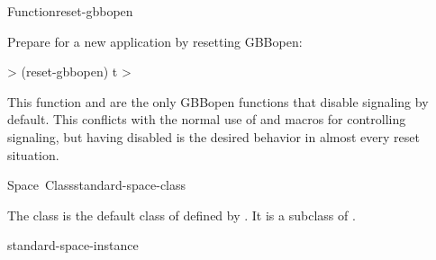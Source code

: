 \documentclass[10pt,twoside,english,pdftex]{article}
\begin{document}
\begin{functiondoc}{Function}{reset-gbbopen}
\fnexample

Prepare for a new application by resetting GBBopen:
%
\W\supp
\begin{example}
  > (reset-gbbopen)
  t
  >
\end{example}

\fnnote
%
%
%
This function and  are
the only GBBopen functions that disable  signaling by default.
This conflicts with the normal use of
 and
 macros for controlling
 signaling, but having  disabled is the desired
behavior in almost every reset situation.

\end{functiondoc}


\begin{functiondoc}{Space~Class}{standard-space-class}{}
%
%
%
  
\fnsyntax

\fnpackage {}

\fnmodule {}

\fndescription 
{}%
%
%
The class  is the default class of
 defined by
.  It is a subclass of
.

\begin{alsos}{standard-space-instance}
\end{alsos}

\end{functiondoc}

\end{document}

